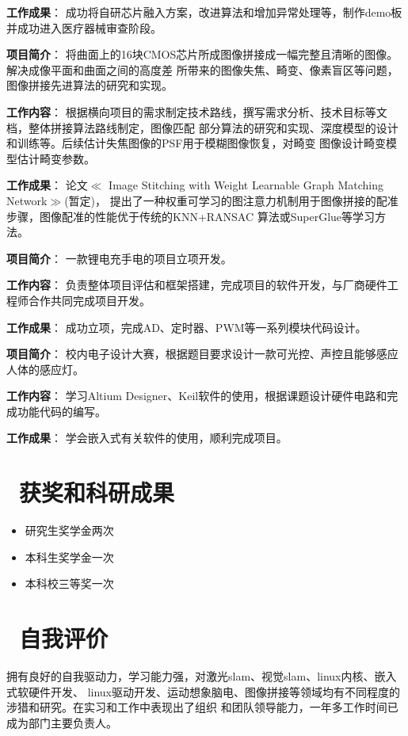 \documentclass{resume}
\begin{document}
\textcolor[RGB]{80,100,190}{\textbf{工作成果}}：
成功将自研芯片融入方案，改进算法和增加异常处理等，制作demo板并成功进入医疗器械审查阶段。

\textcolor[RGB]{80,100,190}{\textbf{项目简介}}：
将曲面上的16块CMOS芯片所成图像拼接成一幅完整且清晰的图像。解决成像平面和曲面之间的高度差
所带来的图像失焦、畸变、像素盲区等问题，图像拼接先进算法的研究和实现。

\textcolor[RGB]{80,100,190}{\textbf{工作内容}}：
根据横向项目的需求制定技术路线，撰写需求分析、技术目标等文档，整体拼接算法路线制定，图像匹配
部分算法的研究和实现、深度模型的设计和训练等。后续估计失焦图像的PSF用于模糊图像恢复，对畸变
图像设计畸变模型估计畸变参数。

\textcolor[RGB]{80,100,190}{\textbf{工作成果}}：
论文$\ll$ Image Stitching with Weight Learnable Graph Matching Network$\gg$(暂定)，
提出了一种权重可学习的图注意力机制用于图像拼接的配准步骤，图像配准的性能优于传统的KNN+RANSAC
算法或SuperGlue等学习方法。

\textcolor[RGB]{80,100,190}{\textbf{项目简介}}：
一款锂电充手电的项目立项开发。

\textcolor[RGB]{80,100,190}{\textbf{工作内容}}：
负责整体项目评估和框架搭建，完成项目的软件开发，与厂商硬件工程师合作共同完成项目开发。

\textcolor[RGB]{80,100,190}{\textbf{工作成果}}：
成功立项，完成AD、定时器、PWM等一系列模块代码设计。


\textcolor[RGB]{80,100,190}{\textbf{项目简介}}：
校内电子设计大赛，根据题目要求设计一款可光控、声控且能够感应人体的感应灯。

\textcolor[RGB]{80,100,190}{\textbf{工作内容}}：
学习Altium Designer、Keil软件的使用，根据课题设计硬件电路和完成功能代码的编写。

\textcolor[RGB]{80,100,190}{\textbf{工作成果}}：
学会嵌入式有关软件的使用，顺利完成项目。


\section{\textcolor[RGB]{50,50,190}{\faPaperPlane\ 获奖和科研成果}}
\begin{itemize}
  \item 研究生奖学金两次
  \item 本科生奖学金一次
  \item 本科校三等奖一次
\end{itemize}

\section{\textcolor[RGB]{50,50,190}{\faChild\ 自我评价}}
拥有良好的自我驱动力，学习能力强，对激光slam、视觉slam、linux内核、嵌入式软硬件开发、
linux驱动开发、运动想象脑电、图像拼接等领域均有不同程度的涉猎和研究。在实习和工作中表现出了组织
和团队领导能力，一年多工作时间已成为部门主要负责人。



%
%
\end{document}
